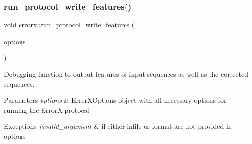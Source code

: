 \subsubsection{\texorpdfstring{run\+\_\+protocol\+\_\+write\+\_\+features()}{run\_protocol\_write\_features()}}
{\footnotesize\ttfamily void errorx\+::run\+\_\+protocol\+\_\+write\+\_\+features (\begin{DoxyParamCaption}\item[{\mbox{\hyperlink{classerrorx_1_1_error_x_options}{Error\+X\+Options}} \&}]{options }\end{DoxyParamCaption})}

Debugging function to output features of input sequences as well as the corrected sequences.


\begin{DoxyParams}{Parameters}
{\em options} & Error\+X\+Options object with all necessary options for running the ErrorX protocol\\
\hline
\end{DoxyParams}

\begin{DoxyExceptions}{Exceptions}
{\em invalid\+\_\+argument} & if either infile or format are not provided in options \\
\hline
\end{DoxyExceptions}
